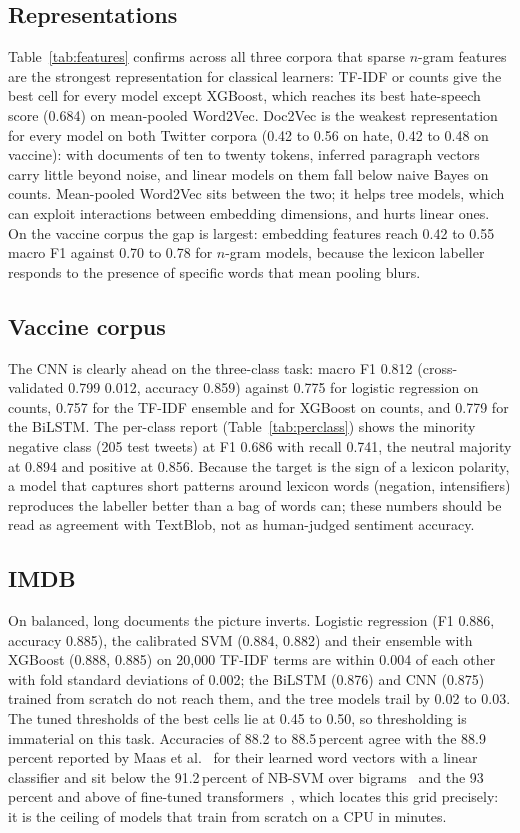 \documentclass[journal,10pt]{IEEEtran}
\begin{document}
\subsection{Representations}

Table~\ref{tab:features} confirms across all three corpora that sparse $n$-gram features are the strongest representation for classical learners: TF-IDF or counts give the best cell for every model except XGBoost, which reaches its best hate-speech score (0.684) on mean-pooled Word2Vec. Doc2Vec is the weakest representation for every model on both Twitter corpora (0.42 to 0.56 on hate, 0.42 to 0.48 on vaccine): with documents of ten to twenty tokens, inferred paragraph vectors carry little beyond noise, and linear models on them fall below naive Bayes on counts. Mean-pooled Word2Vec sits between the two; it helps tree models, which can exploit interactions between embedding dimensions, and hurts linear ones. On the vaccine corpus the gap is largest: embedding features reach 0.42 to 0.55 macro F1 against 0.70 to 0.78 for $n$-gram models, because the lexicon labeller responds to the presence of specific words that mean pooling blurs.

\subsection{Vaccine corpus}
The CNN is clearly ahead on the three-class task: macro F1 0.812 (cross-validated 0.799 \textpm{} 0.012, accuracy 0.859) against 0.775 for logistic regression on counts, 0.757 for the TF-IDF ensemble and for XGBoost on counts, and 0.779 for the BiLSTM. The per-class report (Table~\ref{tab:perclass}) shows the minority negative class (205 test tweets) at F1 0.686 with recall 0.741, the neutral majority at 0.894 and positive at 0.856. Because the target is the sign of a lexicon polarity, a model that captures short patterns around lexicon words (negation, intensifiers) reproduces the labeller better than a bag of words can; these numbers should be read as agreement with TextBlob, not as human-judged sentiment accuracy.

\subsection{IMDB}
On balanced, long documents the picture inverts. Logistic regression (F1 0.886, accuracy 0.885), the calibrated SVM (0.884, 0.882) and their ensemble with XGBoost (0.888, 0.885) on 20,000 TF-IDF terms are within 0.004 of each other with fold standard deviations of 0.002; the BiLSTM (0.876) and CNN (0.875) trained from scratch do not reach them, and the tree models trail by 0.02 to 0.03. The tuned thresholds of the best cells lie at 0.45 to 0.50, so thresholding is immaterial on this task. Accuracies of 88.2 to 88.5\,percent agree with the 88.9\,percent reported by Maas et al.~\cite{maas2011} for their learned word vectors with a linear classifier and sit below the 91.2\,percent of NB-SVM over bigrams~\cite{wang2012} and the 93\,percent and above of fine-tuned transformers~\cite{devlin2019}, which locates this grid precisely: it is the ceiling of models that train from scratch on a CPU in minutes.
\end{document}

